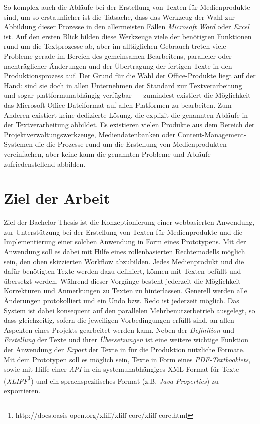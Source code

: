 \documentclass[11pt,a4paper]{article}
\begin{document}
So komplex auch die Abläufe bei der Erstellung von Texten für Medienprodukte sind, um so erstaunlicher ist die Tatsache, dass das Werkzeug der Wahl zur Abbildung dieser Prozesse in den allermeisten Fällen \emph{Microsoft Word} oder \emph{Excel} ist. Auf den ersten Blick bilden diese Werkzeuge viele der benötigten Funktionen rund um die Textprozesse ab, aber im alltäglichen Gebrauch treten viele Probleme gerade im Bereich des gemeinsamen Bearbeitens, paralleler oder nachträglicher Änderungen und der Übertragung der fertigen Texte in den Produktionsprozess auf. Der Grund für die Wahl der Office-Produkte liegt auf der Hand: sind sie doch in allen Unternehmen der Standard zur Textverarbeitung und sogar plattformunabhängig verfügbar --- zumindest existiert die Möglichkeit das Microsoft Office-Dateiformat auf allen Platformen zu bearbeiten. Zum Anderen existiert keine dedizierte Lösung, die explizit die genannten Abläufe in der Textverarbeitung abbildet. Es existieren vielen Produkte aus dem Bereich der Projektverwaltungswerkzeuge, Mediendatenbanken oder Content-Management-Systemen die die Prozesse rund um die Erstellung von Medienprodukten vereinfachen, aber keine kann die genannten Probleme und Abläufe zufriedenstellend abbilden.

\section*{Ziel der Arbeit}

Ziel der Bachelor-Thesis ist die Konzeptionierung einer webbasierten Anwendung, zur Unterstützung bei der Erstellung von Texten für Medienprodukte und die Implementierung einer solchen Anwendung in Form eines Prototypens. Mit der Anwendung soll es dabei mit Hilfe eines rollenbasierten Rechtemodells möglich sein, den oben skizzierten Workflow abzubilden. Jedes Medienprodukt und die dafür benötigten Texte werden dazu definiert, können mit Texten befüllt und übersetzt werden. Während dieser Vorgänge besteht jederzeit die Möglichkeit Korrekturen und Anmerkungen zu Texten zu hinterlassen. Generell werden alle Änderungen protokolliert und ein Undo bzw. Redo ist jederzeit möglich. Das System ist dabei konsequent auf den parallelen Mehrbenutzerbetrieb ausgelegt, so dass gleichzeitig, sofern die jeweiligen Vorbedingungen erfüllt sind, an allen Aspekten eines Projekts gearbeitet werden kann. Neben der \emph{Definition} und \emph{Erstellung} der Texte und ihrer \emph{Übersetzungen} ist eine weitere wichtige Funktion der Anwendung der \emph{Export} der Texte in für die Produktion nützliche Formate. Mit dem Prototypen soll es möglich sein, Texte in Form eines \emph{PDF-Textbooklets}, sowie mit Hilfe einer \emph{API} in ein systemunabhängiges XML-Format für Texte (\emph{XLIFF}\footnote{http://docs.oasis-open.org/xliff/xliff-core/xliff-core.html}) und ein sprachspezifisches Format (z.B. \emph{Java Properties}) zu exportieren. 
\end{document}
